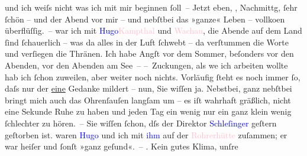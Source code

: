                und ich weiſs nicht was ich mit mir beginnen ſoll –\pend
           \pstart
           Jetzt eben, \label{K_L00921_3v}\label{K_L00921_3h}, Nachmittg, ſehr ſchön
               – und der Abend vor mir – und nebſtbei das »ganze« Leben – vollko{\geminationm}en {\pb}überflüſſig. –\pend
           \pstart
           \label{K_L00921_4v}\label{K_L00921_4h} war ich mit \textcolor{blue}{Hugo}{}\ledrightnote{\textcolor{blue}{Hugo von Hofmannsthal}}{ }\textcolor{pink}{Kampthal}{}\ledrightnote{\textcolor{pink}{Kamptal}} und \textcolor{pink}{Wachau}{}\ledrightnote{\textcolor{pink}{Wachau}}, die Abende auf dem Land ſind ſchauerlich – was da alles in der Luft
               ſchwebt – da verſtummen die Worte und verſiegen die Thränen. Ich habe Angſt vor dem
               Sommer, beſonders vor den Abenden, vor den Abenden am See –\pend
           \pstart
           – Zuckungen, als we{\geminationn} ich {\pb}arbeiten wollte hab ich ſchon zuweilen, aber weiter noch nichts. Vorläufig ſteht es
               noch immer ſo, daſs nur der \uline{eine} Gedanke mildert –
               nun, Sie wiſſen ja.\pend
           \pstart
           Nebstbei, ganz nebſtbei bringt mich auch das Ohrenſauſen langſam um – es iſt wahrhaft
               gräßlich, nicht eine Sekunde Ruhe zu haben und jeden Tag ein wenig nur {\pb}ein ganz klein wenig ſchlechter zu hören. –\pend
           \pstart
           Sie wiſſen ſchon, dſs der Direktor \textcolor{blue}{Schleſinger}{}\ledrightnote{\textcolor{blue}{Emil Schlesinger}}
               geſtern geſtorben ist. \label{K_L00921_5v}\label{K_L00921_5h} waren \textcolor{blue}{Hugo}{}\ledrightnote{\textcolor{blue}{Hugo von Hofmannsthal}} und ich mit \textcolor{blue}{ihm}{} auf der \textcolor{pink}{Rohrerhütte}{}\ledrightnote{\textcolor{pink}{Rohrerhütte}} zuſammen; er war heiſer und ſonſt »ganz geſund«. –\pend
           \pstart
           \label{K_L00921_6v}\label{K_L00921_6h}. Kein gutes Klima, unſre
